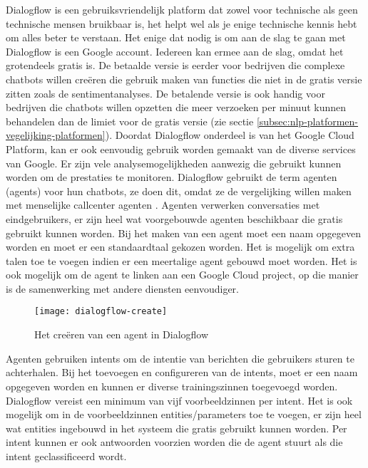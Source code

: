 Dialogflow is een gebruiksvriendelijk platform dat zowel voor technische als geen technische mensen bruikbaar is, het helpt wel als je enige technische kennis hebt om alles beter te verstaan. Het enige dat nodig is om aan de slag te gaan met Dialogflow is een Google account. Iedereen kan ermee aan de slag, omdat het grotendeels gratis is. De betaalde versie is eerder voor bedrijven die complexe chatbots willen creëren die gebruik maken van functies die niet in de gratis versie zitten zoals de sentimentanalyses. De betalende versie is ook handig voor bedrijven die chatbots willen opzetten die meer verzoeken per minuut kunnen behandelen dan de limiet voor de gratis versie (zie sectie \ref{subsec:nlp-platformen-vegelijking-platformen}). Doordat Dialogflow onderdeel is van het Google Cloud Platform, kan er ook eenvoudig gebruik worden gemaakt van de diverse services van Google. Er zijn vele analysemogelijkheden aanwezig die gebruikt kunnen worden om de prestaties te monitoren. Dialogflow gebruikt de term agenten (agents) voor hun chatbots, ze doen dit, omdat ze de vergelijking willen maken met menselijke callcenter agenten \autocite{GoogleCloud2020}. Agenten verwerken conversaties met eindgebruikers, er zijn heel wat voorgebouwde agenten beschikbaar die gratis gebruikt kunnen worden. Bij het maken van een agent moet een naam opgegeven worden en moet er een standaardtaal gekozen worden. Het is mogelijk om extra talen toe te voegen indien er een meertalige agent gebouwd moet worden. Het is ook mogelijk om de agent te linken aan een Google Cloud project, op die manier is de samenwerking met andere diensten eenvoudiger. 

\begin{figure}[H]
    \label{fig:dialogflow-create}
    \centering
    \texttt{[image: dialogflow-create]}
    \caption{Het creëren van een agent in Dialogflow}
\end{figure}

Agenten gebruiken intents om de intentie van berichten die gebruikers sturen te achterhalen. Bij het toevoegen en configureren van de intents, moet er een naam opgegeven worden en kunnen er diverse trainingszinnen toegevoegd worden. Dialogflow vereist een minimum van vijf voorbeeldzinnen per intent. Het is ook mogelijk om in de voorbeeldzinnen entities/parameters toe te voegen, er zijn heel wat entities ingebouwd in het systeem die gratis gebruikt kunnen worden. Per intent kunnen er ook antwoorden voorzien worden die de agent stuurt als die intent geclassificeerd wordt.

